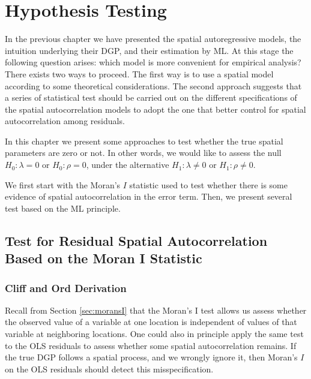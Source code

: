 \documentclass[english,12pt]{book}\usepackage[]{graphicx}\usepackage[]{xcolor}
\begin{document}
\chapter{Hypothesis Testing}

In the previous chapter we have presented the spatial autoregressive models, the intuition underlying their DGP, and their estimation by ML. At this stage the following question arises: which model is more convenient for empirical analysis? There exists two ways to proceed. The first way is to use a spatial model according to some theoretical considerations. The second approach suggests that a series of statistical test should be carried out on the different specifications of the spatial autocorrelation models to adopt the one that better control for spatial autocorrelation among residuals. 

In this chapter we present some approaches to test whether the true spatial parameters are zero or not. In other words, we would like to assess the null $H_0:\lambda = 0$ or $H_0: \rho = 0$, under the alternative $H_1: \lambda \neq 0$ or $H_1:\rho \neq 0$.

We first start with the Moran's $I$ statistic used to test whether there is some evidence of spatial autocorrelation in the error term. Then, we present several test based on the ML principle. 


\section{Test for Residual Spatial Autocorrelation Based on the Moran I Statistic}


\subsection{Cliff and Ord Derivation}

Recall from Section \ref{sec:moransI} that the Moran's I test allows us assess whether the observed value of a variable at one location is independent of values of that variable at neighboring locations. One could also in principle apply the same test to the OLS residuals to assess whether some spatial autocorrelation remains. If the true DGP follows a spatial process, and we wrongly ignore it, then Moran's $I$ on the OLS residuals should detect this misspecification.
\end{document}
